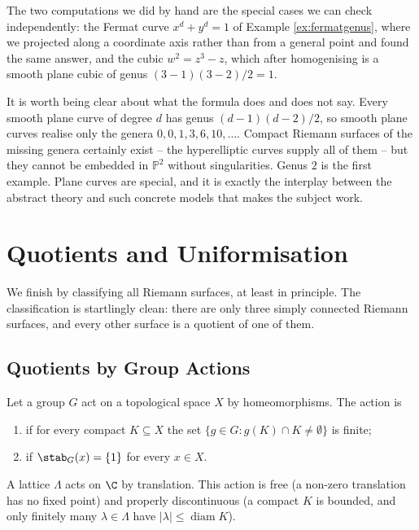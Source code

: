 The two computations we did by hand are the special cases we can check independently: the
Fermat curve $x^d + y^d = 1$ of Example \ref{ex:fermatgenus}, where we projected along a
coordinate axis rather than from a general point and found the same answer, and the cubic
$w^2 = z^3 - z$, which after homogenising is a smooth plane cubic of genus
$(3-1)(3-2)/2 = 1$.

\begin{remark}
	It is worth being clear about what the formula does and does not say. Every smooth
	plane curve of degree $d$ has genus $(d-1)(d-2)/2$, so smooth plane curves realise only
	the genera $0, 0, 1, 3, 6, 10, \dots$. Compact Riemann surfaces of the missing genera
	certainly exist -- the hyperelliptic curves supply all of them -- but they cannot be
	embedded in $\mathbb{P}^2$ without singularities. Genus $2$ is the first example.
	Plane curves are special, and it is exactly the interplay between the abstract theory
	and such concrete models that makes the subject work.
\end{remark}

\section{Quotients and Uniformisation}

We finish by classifying all Riemann surfaces, at least in principle. The classification
is startlingly clean: there are only three simply connected Riemann surfaces, and every
other surface is a quotient of one of them.

\subsection{Quotients by Group Actions}

\begin{definition}
	Let a group $G$ act on a topological space $X$ by homeomorphisms. The action is
	\begin{enumerate}[label=(\roman*)]
		\item {} if for every compact $K \subseteq X$ the set
		$\{g\in G : g(K)\cap K \neq\emptyset\}$ is finite;
		\item {} if $\stab_G(x) = \{1\}$ for every $x \in X$.
	\end{enumerate}
\end{definition}

\begin{example}
	A lattice $\Lambda$ acts on $\C$ by translation. This action is free (a non-zero
	translation has no fixed point) and properly discontinuous (a compact $K$ is bounded,
	and only finitely many $\lambda\in\Lambda$ have $|\lambda| \le \operatorname{diam}K$).
\end{example}

